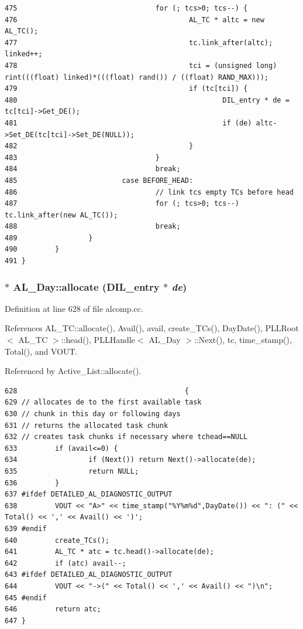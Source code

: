 \begin{verbatim}
475                                 for (; tcs>0; tcs--) {
476                                         AL_TC * altc = new AL_TC();
477                                         tc.link_after(altc); linked++;
478                                         tci = (unsigned long) rint(((float) linked)*(((float) rand()) / ((float) RAND_MAX)));
479                                         if (tc[tci]) {
480                                                 DIL_entry * de = tc[tci]->Get_DE();
481                                                 if (de) altc->Set_DE(tc[tci]->Set_DE(NULL));
482                                         }
483                                 }
484                                 break;
485                         case BEFORE_HEAD:
486                                 // link tcs empty TCs before head
487                                 for (; tcs>0; tcs--) tc.link_after(new AL_TC());
488                                 break;
489                 }
490         }
491 }
\end{verbatim}\normalsize 
{}
\subsubsection{ $\ast$ AL\_\-Day::allocate ({\bf DIL\_\-entry} $\ast$ {\em de})}\label{classAL__Day_a23}




Definition at line 628 of file alcomp.cc.

References AL\_\-TC::allocate(), Avail(), avail, create\_\-TCs(), Day\-Date(), PLLRoot$<$ AL\_\-TC $>$::head(), PLLHandle$<$ AL\_\-Day $>$::Next(), tc, time\_\-stamp(), Total(), and VOUT.

Referenced by Active\_\-List::allocate().



\footnotesize\begin{verbatim}628                                        {
629 // allocates de to the first available task
630 // chunk in this day or following days
631 // returns the allocated task chunk
632 // creates task chunks if necessary where tchead==NULL
633         if (avail<=0) {
634                 if (Next()) return Next()->allocate(de);
635                 return NULL;
636         }
637 #ifdef DETAILED_AL_DIAGNOSTIC_OUTPUT
638         VOUT << "A>" << time_stamp("%Y%m%d",DayDate()) << ": (" << Total() << ',' << Avail() << ')';
639 #endif
640         create_TCs();
641         AL_TC * atc = tc.head()->allocate(de);
642         if (atc) avail--;
643 #ifdef DETAILED_AL_DIAGNOSTIC_OUTPUT
644         VOUT << "->(" << Total() << ',' << Avail() << ")\n";
645 #endif
646         return atc;
647 }
\end{verbatim}\normalsize 
{}
